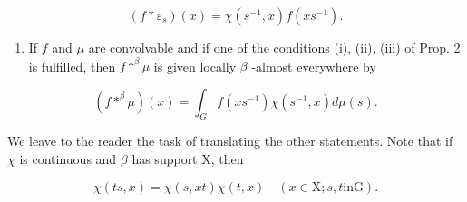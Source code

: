 \[
(f * \varepsilon_ {s}) (x) = \chi (s ^ {- 1}, x) f (x s ^ {- 1}).\tag{4}
\]

\begin{enumerate}
\def\labelenumi{\arabic{enumi})}
\setcounter{enumi}{1}
\tightlist
\item
  If \(f\) and \(\mu\) are convolvable and if one of the conditions (i), (ii), (iii) of Prop. 2 is fulfilled, then \(f *^{\beta} \mu\) is given locally \(\beta\) -almost everywhere by
\end{enumerate}

\[
(f * ^ {\beta} \mu) (x) = \int_ {G} f (x s ^ {- 1}) \chi (s ^ {- 1}, x) d \mu (s).\tag{5}
\]

We leave to the reader the task of translating the other statements. Note that if \(\chi\) is continuous and \(\beta\) has support X, then

\[
\chi (t s, x) = \chi (s, x t) \chi (t, x) \quad (x \in \mathrm{X}; s, t \text {in} \mathrm{G}).\tag{6}
\]

